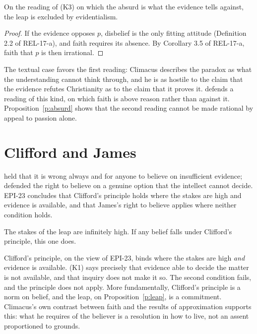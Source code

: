 \documentclass{situationist-preprint}
\begin{document}
\begin{proposition}\label{p:absurd}
On the reading of (K3) on which the absurd is what the evidence tells against, the leap is excluded by evidentialism.
\end{proposition}

\begin{proof}
If the evidence opposes $p$, disbelief is the only fitting attitude (Definition 2.2 of REL-17-a), and faith requires its absence. By Corollary 3.5 of REL-17-a, faith that $p$ is then irrational.
\end{proof}

The textual case favors the first reading: Climacus describes the paradox as what the understanding cannot think through, and he is as hostile to the claim that the evidence refutes Christianity as to the claim that it proves it. \citet{Evans1998} defends a reading of this kind, on which faith is above reason rather than against it. Proposition~\ref{p:absurd} shows that the second reading cannot be made rational by appeal to passion alone.

\section{Clifford and James}

\citet{Clifford1877} held that it is wrong always and for anyone to believe on insufficient evidence; \citet{James1896} defended the right to believe on a genuine option that the intellect cannot decide. EPI-23 concludes that Clifford's principle holds where the stakes are high and evidence is available, and that James's right to believe applies where neither condition holds.

\begin{objection}
The stakes of the leap are infinitely high. If any belief falls under Clifford's principle, this one does.
\end{objection}

\begin{reply}
Clifford's principle, on the view of EPI-23, binds where the stakes are high \emph{and} evidence is available. (K1) says precisely that evidence able to decide the matter is not available, and that inquiry does not make it so. The second condition fails, and the principle does not apply. More fundamentally, Clifford's principle is a norm on belief, and the leap, on Proposition~\ref{p:leap}, is a commitment. Climacus's own contrast between faith and the results of approximation supports this: what he requires of the believer is a resolution in how to live, not an assent proportioned to grounds.
\end{reply}
\end{document}
